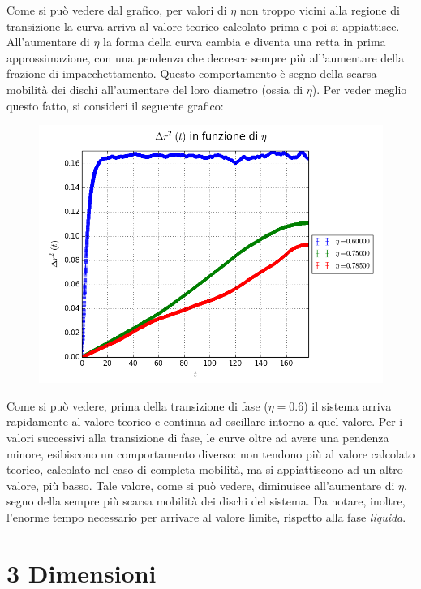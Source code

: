Come si può vedere dal grafico, per valori di $\eta$ non troppo vicini alla regione di transizione la curva arriva al valore teorico calcolato prima e poi si appiattisce. All'aumentare di $\eta$ la forma della curva cambia e diventa una retta in prima approssimazione, con una pendenza che decresce sempre più all'aumentare della frazione di impacchettamento. Questo comportamento è segno della scarsa mobilità dei dischi all'aumentare del loro diametro (ossia di $\eta$).
Per veder meglio questo fatto, si consideri il seguente grafico:
\begin{center}
	\begin{figure}[h!]
		\centering
		\includegraphics[scale=0.5]{sfere2D/dr2cfr.png}
	\end{figure}
\end{center}

Come si può vedere, prima della transizione di fase ($\eta=0.6$) il sistema arriva rapidamente al valore teorico e continua ad oscillare intorno a quel valore.
Per i valori successivi alla transizione di fase, le curve oltre ad avere una pendenza minore, esibiscono un comportamento diverso: non tendono più al valore calcolato teorico, calcolato nel caso di completa mobilità, ma si appiattiscono ad un altro valore, più basso.
Tale valore, come si può vedere, diminuisce all'aumentare di $\eta$, segno della sempre più scarsa mobilità dei dischi del sistema.
Da notare, inoltre, l'enorme tempo necessario per arrivare al valore limite, rispetto alla fase \emph{liquida}.


\newpage
\section{3 Dimensioni}

